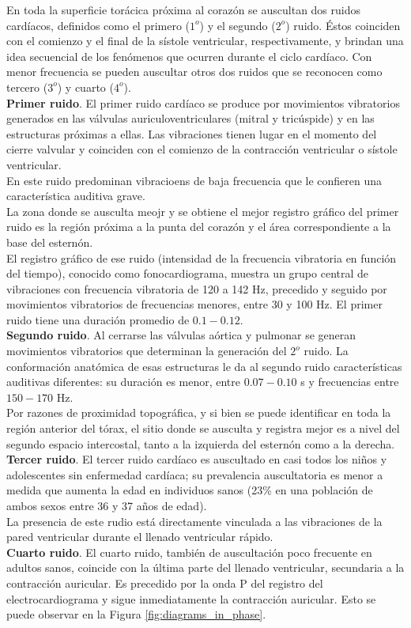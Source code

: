     En toda la superficie torácica próxima al corazón se auscultan dos ruidos cardíacos, definidos como el primero ($1^o$) y el segundo ($2^o$) ruido. Éstos coinciden con el comienzo y el final de la sístole ventricular, respectivamente, y brindan una idea secuencial de los fenómenos que ocurren durante el ciclo cardíaco. Con menor frecuencia se pueden auscultar otros dos ruidos que se reconocen como tercero ($3^o$) y cuarto ($4^o$). \\
    \indent \textbf{Primer ruido}. El primer ruido cardíaco se produce por movimientos vibratorios generados en las válvulas auriculoventriculares (mitral y tricúspide) y en las estructuras próximas a ellas. Las vibraciones tienen lugar en el momento del cierre valvular y coinciden con el comienzo de la contracción ventricular o sístole ventricular. \\
    \indent En este ruido predominan vibracioens de baja frecuencia que le confieren una característica auditiva grave. \\
    \indent La zona donde se ausculta meojr y se obtiene el mejor registro gráfico del primer ruido es la región próxima a la punta del corazón y el área correspondiente a la base del esternón. \\
    \indent El registro gráfico de ese ruido (intensidad de la frecuencia vibratoria en función del tiempo), conocido como fonocardiograma, muestra un grupo central de vibraciones con frecuencia vibratoria de 120 a 142 Hz, precedido y seguido por movimientos vibratorios de frecuencias menores, entre 30 y 100 Hz. El primer ruido tiene una duración promedio de $0.1-0.12$. \\
    \indent \textbf{Segundo ruido}. Al cerrarse las válvulas aórtica y pulmonar se generan movimientos vibratorios que determinan la generación del $2^o$ ruido. La conformación anatómica de esas estructuras le da al segundo ruido características auditivas diferentes: su duración es menor, entre $0.07-0.10$ s y frecuencias entre $150-170$ Hz. \\
    \indent Por razones de proximidad topográfica, y si bien se puede identificar en toda la región anterior del tórax, el sitio donde se ausculta y registra mejor es a nivel del segundo espacio intercostal, tanto a la izquierda del esternón como a la derecha.
    \indent \textbf{Tercer ruido}. El tercer ruido cardíaco es auscultado en casi todos los niños y adolescentes sin enfermedad cardíaca; su prevalencia auscultatoria es menor a medida que aumenta la edad en individuos sanos (23\% en una población de ambos sexos entre 36 y 37 años de edad). \\
    \indent La presencia de este rudio está directamente vinculada a las vibraciones de la pared ventricular durante el llenado ventricular rápido. \\
    \indent \textbf{Cuarto ruido}. El cuarto ruido, también de auscultación poco frecuente en adultos sanos, coincide con la última parte del llenado ventricular, secundaria a la contracción auricular. Es precedido por la onda P del registro del electrocardiograma y sigue inmediatamente la contracción auricular. Esto se puede observar en la Figura \ref{fig:diagrams_in_phase}. 
    
